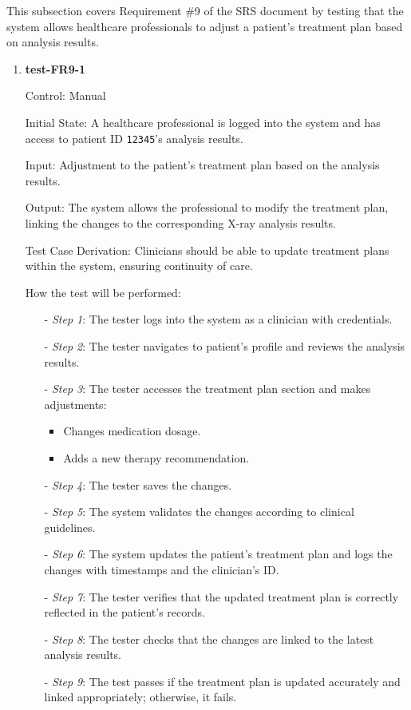 \documentclass[12pt, titlepage]{article}
\begin{document}
This subsection covers Requirement \#9 of the SRS document by testing that the system allows healthcare professionals to adjust a patient's treatment plan based on analysis results.

\begin{enumerate}

\item \textbf{test-FR9-1} \label{test-FR9-1}

Control: Manual

Initial State: A healthcare professional is logged into the system and has access to patient ID \texttt{12345}'s analysis results.

Input: Adjustment to the patient's treatment plan based on the analysis results.

Output: The system allows the professional to modify the treatment plan, linking the changes to the corresponding X-ray analysis results.

Test Case Derivation: Clinicians should be able to update treatment plans within the system, ensuring continuity of care.

How the test will be performed:

\begin{itemize}
\item[-] \textit{Step 1}: The tester logs into the system as a clinician with credentials.
\item[-] \textit{Step 2}: The tester navigates to patient's profile and reviews the analysis results.
\item[-] \textit{Step 3}: The tester accesses the treatment plan section and makes adjustments:
  \begin{itemize}
    \item Changes medication dosage.
    \item Adds a new therapy recommendation.
  \end{itemize}
\item[-] \textit{Step 4}: The tester saves the changes.
\item[-] \textit{Step 5}: The system validates the changes according to clinical guidelines.
\item[-] \textit{Step 6}: The system updates the patient's treatment plan and logs the changes with timestamps and the clinician's ID.
\item[-] \textit{Step 7}: The tester verifies that the updated treatment plan is correctly reflected in the patient's records.
\item[-] \textit{Step 8}: The tester checks that the changes are linked to the latest analysis results.
\item[-] \textit{Step 9}: The test passes if the treatment plan is updated accurately and linked appropriately; otherwise, it fails.
\end{itemize}
\end{enumerate}
\end{document}
